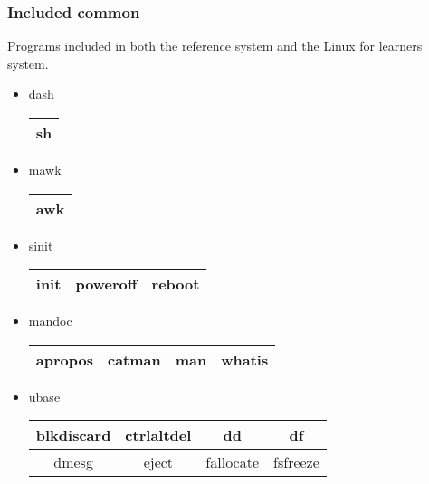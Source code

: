 \subsubsection{Included common}

Programs included in both the reference system and the Linux for learners system.

\begin{itemize}
    \item dash
        \begin{center}
            \begin{tabular}{|c|}
                \hline
                sh \\
                \hline
            \end{tabular}
        \end{center}
    \item mawk
        \begin{center}
            \begin{tabular}{|c|}
                \hline   
                awk \\
                \hline
            \end{tabular}
        \end{center}
    \item sinit
        \begin{center}
            \begin{tabular}{|c|c|c|}
                \hline
                init & poweroff & reboot \\
                \hline
            \end{tabular}
        \end{center}
    \item mandoc
        \begin{center}
            \begin{tabular}{|c|c|c|c|}
                \hline
                apropos & catman & man & whatis \\
                \hline
            \end{tabular}
        \end{center}
    \item ubase
        \begin{center}
            \begin{tabular}{|c|c|c|c|}
                \hline
                blkdiscard & ctrlaltdel & dd & df \\
                \hline
                dmesg & eject & fallocate & fsfreeze \\

\end{tabular}
\end{center}
\end{itemize}
